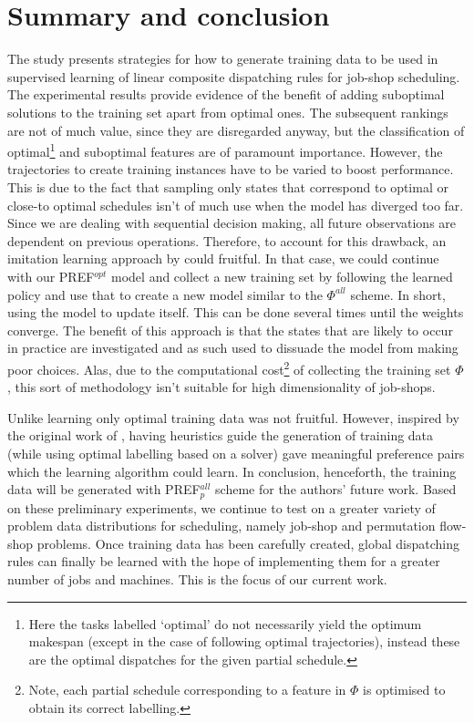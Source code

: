 \documentclass[smallextended]{llncs}
\newcommand{\PREF}[2]{PREF$_{#2}^{#1}$}
\begin{document}
\section{Summary and conclusion}\label{sec:summary}
The study presents strategies for how to generate training data to be used in supervised learning of linear composite dispatching rules for job-shop scheduling.
The experimental results provide evidence of the benefit of adding suboptimal solutions to the training set apart from optimal ones.
The subsequent rankings are not of much value, since they are disregarded anyway, but the classification of optimal\footnote{Here the tasks labelled `optimal' do not necessarily yield the optimum makespan (except in the case of following optimal trajectories), instead these are the optimal dispatches for the given partial schedule.} and suboptimal features are of paramount importance.
However, the trajectories to create training instances have to be varied to boost performance. This is due to the  fact that sampling only states that  correspond  to optimal or close-to optimal schedules isn't of much use when the model has diverged too far. Since we are dealing with sequential decision making, all future observations are dependent on previous operations. 
Therefore, to account for this drawback, an imitation learning approach  by \cite{RossB10,RossGB11} could fruitful. 
In that case, we could continue with our \PREF{opt}{} model and collect a new training set by following the learned policy and use that to create a new model similar to the $\Phi^{all}$ scheme. In short, using the model to update itself. 
This can be done several times until the weights converge. The benefit of this approach is that the states that are likely to occur in practice are investigated and as such used to dissuade the model from making poor choices. Alas, due to the computational cost\footnote{Note, each partial schedule corresponding to a feature in $\Phi$ is optimised to obtain its correct labelling.} of collecting the training set $\Phi$, this sort of methodology isn't suitable for high dimensionality of job-shops. 

Unlike \cite{Siggi10,Malik08,Russell09} learning only optimal training data was not fruitful. However, inspired by the original work of \cite{Siggi05}, having heuristics guide the generation of training data (while using optimal labelling based on a solver) gave meaningful preference pairs which the learning algorithm could learn. In conclusion, henceforth, the training data will be generated with \PREF{all}{p} scheme for the authors' future work.
Based on these preliminary experiments, we continue to test on a greater variety of problem data distributions for scheduling, namely job-shop and permutation flow-shop problems. Once training data has been carefully created, global dispatching rules can finally be learned with the hope of implementing them for a greater number of jobs and machines. This is the focus of our current work.
 
\end{document}

